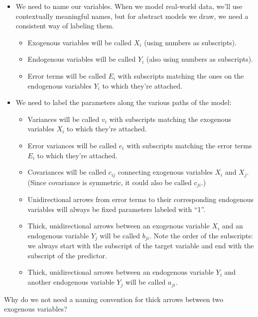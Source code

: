 \documentclass[
]{book}
\providecommand{\tightlist}{%
  \setlength{\itemsep}{0pt}\setlength{\parskip}{0pt}}
\begin{document}
\begin{itemize}
\tightlist
\item
  We need to name our variables. When we model real-world data, we'll use contextually meaningful names, but for abstract models we draw, we need a consistent way of labeling them.

  \begin{itemize}
  \tightlist
  \item
    Exogenous variables will be called \(X_{i}\) (using numbers as subscripts).
  \item
    Endogenous variables will be called \(Y_{i}\) (also using numbers as subscripts).
  \item
    Error terms will be called \(E_{i}\) with subscripts matching the ones on the endogenous variables \(Y_{i}\) to which they're attached.
  \end{itemize}
\item
  We need to label the parameters along the various paths of the model:

  \begin{itemize}
  \tightlist
  \item
    Variances will be called \(v_{i}\) with subscripts matching the exogenous variables \(X_{i}\) to which they're attached.
  \item
    Error variances will be called \(e_{i}\) with subscripts matching the error terms \(E_{i}\) to which they're attached.
  \item
    Covariances will be called \(c_{ij}\) connecting exogenous variables \(X_{i}\) and \(X_{j}\). (Since covariance is symmetric, it could also be called \(c_{ji}\).)
  \item
    Unidirectional arrows from error terms to their corresponding endogenous variables will always be fixed parameters labeled with ``1''.
  \item
    Thick, unidirectional arrows between an exogenous variable \(X_{i}\) and an endogenous variable \(Y_{j}\) will be called \(b_{ji}\). Note the order of the subscripts: we always start with the subscript of the target variable and end with the subscript of the predictor.
  \item
    Thick, unidirectional arrows between an endogenous variable \(Y_{i}\) and another endogenous variable \(Y_{j}\) will be called \(a_{ji}\).
  \end{itemize}
\end{itemize}

Why do we not need a naming convention for thick arrows between two exogenous variables?
\end{document}
